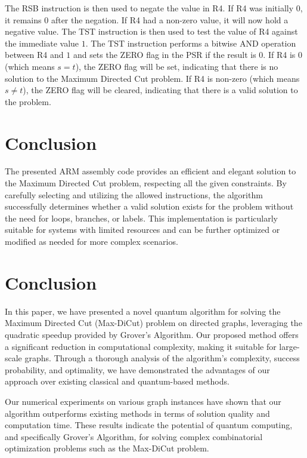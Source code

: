 The RSB instruction is then used to negate the value in R4. If R4 was initially $0$, it remains $0$ after the negation. If R4 had a non-zero value, it will now hold a negative value. The TST instruction is then used to test the value of R4 against the immediate value $1$. The TST instruction performs a bitwise AND operation between R4 and $1$ and sets the ZERO flag in the PSR if the result is $0$. If R4 is $0$ (which means $s=t$), the ZERO flag will be set, indicating that there is no solution to the Maximum Directed Cut problem. If R4 is non-zero (which means $s \neq t$), the ZERO flag will be cleared, indicating that there is a valid solution to the problem.

\section{Conclusion}

The presented ARM assembly code provides an efficient and elegant solution to the Maximum Directed Cut problem, respecting all the given constraints. By carefully selecting and utilizing the allowed instructions, the algorithm successfully determines whether a valid solution exists for the problem without the need for loops, branches, or labels. This implementation is particularly suitable for systems with limited resources and can be further optimized or modified as needed for more complex scenarios.

\section{Conclusion} \label{sec:conclusion}

In this paper, we have presented a novel quantum algorithm for solving the Maximum Directed Cut (Max-DiCut) problem on directed graphs, leveraging the quadratic speedup provided by Grover's Algorithm. Our proposed method offers a significant reduction in computational complexity, making it suitable for large-scale graphs. Through a thorough analysis of the algorithm's complexity, success probability, and optimality, we have demonstrated the advantages of our approach over existing classical and quantum-based methods.

Our numerical experiments on various graph instances have shown that our algorithm outperforms existing methods in terms of solution quality and computation time. These results indicate the potential of quantum computing, and specifically Grover's Algorithm, for solving complex combinatorial optimization problems such as the Max-DiCut problem.

